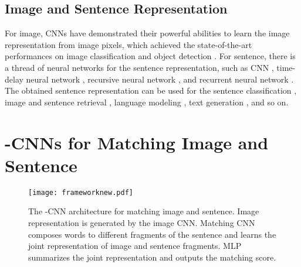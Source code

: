 \documentclass[10pt,twocolumn,letterpaper]{article}
\begin{document}
\subsection{Image and Sentence Representation}
For image, CNNs have demonstrated their powerful abilities to learn the image representation from image pixels, which achieved the state-of-the-art performances on image classification \cite{he_eccv2014,simonyan_arxiv2014,szegedy_arxiv2014,he_arxiv2015} and object detection \cite{ouyang_arxiv14, girshick_cvpr2014}. For sentence, there is a thread of neural networks for the sentence representation, such as CNN \cite{kalchbrenner_acl2014,ykim_emnlp2014}, time-delay neural network \cite{collobert_jmlr2011}, recursive neural network \cite{irsoy_nips2014}, and recurrent neural network \cite{blunsom_arxiv2013,socher_tacl2014,mao_2014,sutskever_icml2011}. The obtained sentence representation can be used for the sentence classification \cite{ykim_emnlp2014}, image and sentence retrieval \cite{socher_tacl2014,mao_2014}, language modeling \cite{collobert_jmlr2011}, text generation \cite{karpathy_dvsa_2014,sutskever_icml2011}, and so on.












\section{-CNNs for Matching Image and Sentence}
\label{sec_model}


\begin{figure}[t!]
\begin{center}
   \texttt{[image: frameworknew.pdf]}

\end{center}
   \caption{The -CNN architecture for matching image and sentence. Image representation is generated by the image CNN. Matching CNN composes words to different fragments of the sentence and learns the joint representation of image and sentence fragments. MLP summarizes the joint representation and outputs the matching score.}
\label{fig:framework}
\end{figure}
\end{document}
